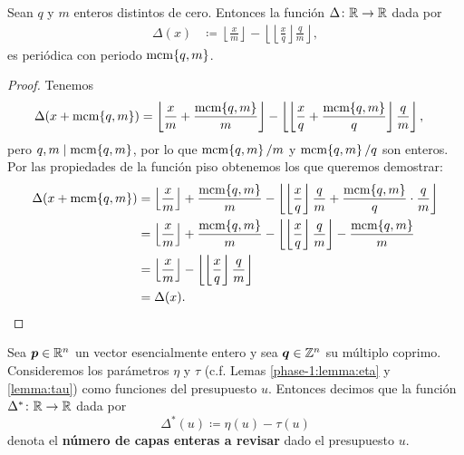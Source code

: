 \begin{lemma}
	\label{lemma:layer-dist}
	Sean $q$ y $m$ enteros distintos de cero. Entonces la función $\Delta \colon \mathbb{R} \to \mathbb{R}$ dada por
	\begin{align*}
		\Delta(x) &\coloneq \left\lfloor \frac{x}{m} \right\rfloor - \left\lfloor \left\lfloor
		\frac{x}{q} \right\rfloor \frac{q}{m} \right\rfloor,
	\end{align*}
	es periódica con periodo $\mathop{\mathrm{mcm}{\left\lbrace q, m \right\rbrace}}$.
\end{lemma}
\begin{proof}
	Tenemos
	\begin{align*}
		\Delta(x + \mathop{\mathrm{mcm}{\left\lbrace q, m \right\rbrace}})
		&= \left\lfloor \frac{x}{m} + \frac{\mathop{\mathrm{mcm}{\left\lbrace q, m \right\rbrace}}}{m} \right\rfloor
		- \left\lfloor \left\lfloor \frac{x}{q} + \frac{\mathop{\mathrm{mcm}{\left\lbrace q,m \right\rbrace}}}{q} \right\rfloor \frac{q}{m}
			\right\rfloor,
	\end{align*}
	pero $q, m \mid \mathop{\mathrm{mcm}{\left\lbrace q, m \right\rbrace}}$, por lo que $\mathop{\mathrm{mcm}{\left\lbrace q,m \right\rbrace}}/m$ y $\mathop{\mathrm{mcm}{\left\lbrace q,m \right\rbrace}}/q$ son enteros. Por las
	propiedades de la función piso obtenemos los que queremos demostrar:
	\begin{align*}
		\Delta(x + \mathop{\mathrm{mcm}{\left\lbrace q,m \right\rbrace}})
		&=
		\left\lfloor \frac{x}{m} \right\rfloor + \frac{\mathop{\mathrm{mcm}{\left\lbrace q,m \right\rbrace}}}{m}
		- \left\lfloor \left\lfloor \frac{x}{q} \right\rfloor\frac{q}{m} + 
			\frac{\mathop{\mathrm{mcm}{\left\lbrace q,m \right\rbrace}}}{q}\cdot\frac{q}{m} \right\rfloor \\
		&= 
		\left\lfloor \frac{x}{m} \right\rfloor + \frac{\mathop{\mathrm{mcm}{\left\lbrace q,m \right\rbrace}}}{m}
		- \left\lfloor \left\lfloor \frac{x}{q} \right\rfloor\frac{q}{m}\right\rfloor
		- \frac{\mathop{\mathrm{mcm}{\left\lbrace q,m \right\rbrace}}}{m} \\
		&= 
		\left\lfloor \frac{x}{m} \right\rfloor
		- \left\lfloor \left\lfloor \frac{x}{q} \right\rfloor\frac{q}{m}\right\rfloor \\
		&= \Delta(x).
	\end{align*}
\end{proof}
\begin{definition}
	Sea $\boldsymbol{p} \in \mathbb{R}^n$ un vector esencialmente entero y sea $\boldsymbol{q} \in \mathbb{Z}^n$ su múltiplo
	coprimo. Consideremos los parámetros $\eta$ y $\tau$ (c.f. Lemas \ref{phase-1:lemma:eta} y
	\ref{lemma:tau}) como funciones del presupuesto $u$. Entonces decimos que la función $\Delta^*
	\colon \mathbb{R} \to \mathbb{R}$ dada por
	\begin{equation}
		\label{eq:dist-layers}
		\Delta^*(u) \coloneq \eta(u) - \tau(u)
	\end{equation}
	denota el \textbf{número de capas enteras a revisar} dado el presupuesto $u$.
\end{definition}

